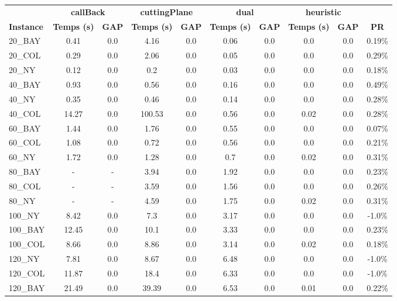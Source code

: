\documentclass[main.tex]{subfiles}
\begin{document}
\begin{center}
\renewcommand{\arraystretch}{1.4} 
 \begin{tabular}{lccccccccc}
	\hline
 & \multicolumn{2}{c}{\textbf{callBack}} & \multicolumn{2}{c}{\textbf{cuttingPlane}} & \multicolumn{2}{c}{\textbf{dual}} & \multicolumn{2}{c}{\textbf{heuristic}}\\
\textbf{Instance}  & \textbf{Temps (s)} & \textbf{GAP} & \textbf{Temps (s)} & \textbf{GAP} & \textbf{Temps (s)} & \textbf{GAP} & \textbf{Temps (s)} & \textbf{GAP} & \textbf{PR} \\\hline

20\_BAY & 0.41 & 0.0 & 4.16 & 0.0 & 0.06 & 0.0 & 0.0 & 0.0 & 0.19\%\\
20\_COL & 0.29 & 0.0 & 2.06 & 0.0 & 0.05 & 0.0 & 0.0 & 0.0 & 0.29\%\\
20\_NY & 0.12 & 0.0 & 0.2 & 0.0 & 0.03 & 0.0 & 0.0 & 0.0 & 0.18\%\\
40\_BAY & 0.93 & 0.0 & 0.56 & 0.0 & 0.16 & 0.0 & 0.0 & 0.0 & 0.49\%\\
40\_NY & 0.35 & 0.0 & 0.46 & 0.0 & 0.14 & 0.0 & 0.0 & 0.0 & 0.28\%\\
40\_COL & 14.27 & 0.0 & 100.53 & 0.0 & 0.56 & 0.0 & 0.02 & 0.0 & 0.28\%\\
60\_BAY & 1.44 & 0.0 & 1.76 & 0.0 & 0.55 & 0.0 & 0.0 & 0.0 & 0.07\%\\
60\_COL & 1.08 & 0.0 & 0.72 & 0.0 & 0.56 & 0.0 & 0.0 & 0.0 & 0.21\%\\
60\_NY & 1.72 & 0.0 & 1.28 & 0.0 & 0.7 & 0.0 & 0.02 & 0.0 & 0.31\%\\
80\_BAY & - & - 
 & 3.94 & 0.0 & 1.92 & 0.0 & 0.0 & 0.0 & 0.23\%\\
80\_COL & - & - 
 & 3.59 & 0.0 & 1.56 & 0.0 & 0.0 & 0.0 & 0.26\%\\
80\_NY & - & - 
 & 4.59 & 0.0 & 1.75 & 0.0 & 0.02 & 0.0 & 0.31\%\\
100\_NY & 8.42 & 0.0 & 7.3 & 0.0 & 3.17 & 0.0 & 0.0 & 0.0 & -1.0\%\\
100\_BAY & 12.45 & 0.0 & 10.1 & 0.0 & 3.33 & 0.0 & 0.0 & 0.0 & 0.23\%\\
100\_COL & 8.66 & 0.0 & 8.86 & 0.0 & 3.14 & 0.0 & 0.02 & 0.0 & 0.18\%\\
120\_NY & 7.81 & 0.0 & 8.67 & 0.0 & 6.48 & 0.0 & 0.0 & 0.0 & -1.0\%\\
120\_COL & 11.87 & 0.0 & 18.4 & 0.0 & 6.33 & 0.0 & 0.0 & 0.0 & -1.0\%\\
120\_BAY & 21.49 & 0.0 & 39.39 & 0.0 & 6.53 & 0.0 & 0.01 & 0.0 & 0.22\%\\

\end{tabular}
\end{center}
\end{document}
